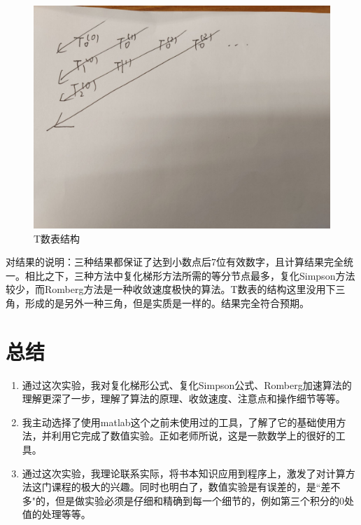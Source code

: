 \documentclass{LabReport}
\begin{document}
\begin{figure}[h!]
	\centering
	\includegraphics[width=0.7\linewidth]{figures/5}
	\caption{T数表结构}
	\label{fig:5}
\end{figure}

{\color{red} 对结果的说明：}三种结果都保证了达到小数点后7位有效数字，且计算结果完全统一。相比之下，三种方法中复化梯形方法所需的等分节点最多，复化Simpson方法较少，而Romberg方法是一种收敛速度极快的算法。T数表的结构这里没用下三角，形成的是另外一种三角，但是实质是一样的。结果完全符合预期。

\section{总结}

\begin{enumerate}
	\item 通过这次实验，我对复化梯形公式、复化Simpson公式、Romberg加速算法的理解更深了一步，理解了算法的原理、收敛速度、注意点和操作细节等等。
	\item 我主动选择了使用matlab这个之前未使用过的工具，了解了它的基础使用方法，并利用它完成了数值实验。正如老师所说，这是一款数学上的很好的工具。
	\item 通过这次实验，我理论联系实际，将书本知识应用到程序上，激发了对计算方法这门课程的极大的兴趣。同时也明白了，数值实验是有误差的，是``差不多"的，但是做实验必须是仔细和精确到每一个细节的，例如第三个积分的0处值的处理等等。
\end{enumerate}
\end{document}
